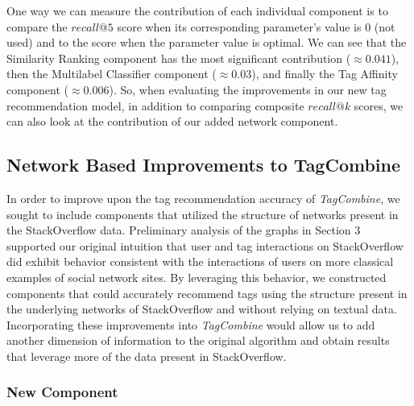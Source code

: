 \documentclass[10pt]{IEEEtran}
\begin{document}
One way we can measure the contribution of each individual component is to compare the $recall@5$ score when its corresponding parameter’s value is $0$ (not used) and to the score when the parameter value is optimal. We can see that the Similarity Ranking component has the most significant contribution ($\approx 0.041$), then the Multilabel Classifier component ($\approx 0.03$), and finally the Tag Affinity component ($\approx 0.006$). So, when evaluating the improvements in our new tag recommendation model, in addition to comparing composite $recall@k$ scores, we can also look at the contribution of our added network component.

\subsection{Network Based Improvements to TagCombine}

In order to improve upon the tag recommendation accuracy of \textit{TagCombine}, we sought to include components that utilized the structure of networks present in the StackOverflow data. Preliminary analysis of the graphs in Section 3 supported our original intuition that user and tag interactions on StackOverflow did exhibit behavior consistent with the interactions of users on more classical examples of social network sites. By leveraging this behavior, we constructed components that could accurately recommend tags using the structure present in the underlying networks of StackOverflow and without relying on textual data. Incorporating these improvements into \textit{TagCombine} would allow us to add another dimension of information to the original algorithm and obtain results that leverage more of the data present in StackOverflow.

\subsubsection{New Component}
\end{document}
